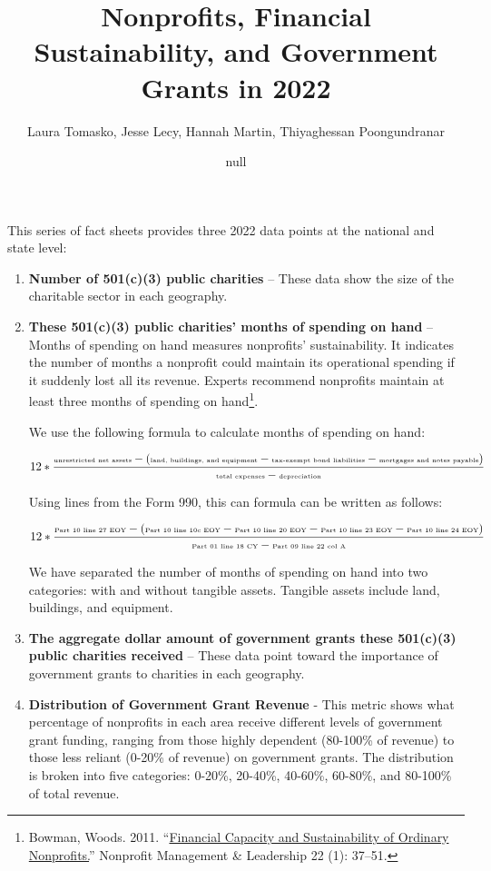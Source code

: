 \documentclass[
]{article}
\title{Nonprofits, Financial Sustainability, and Government Grants in
2022}
\subtitle{{Laura Tomasko, Jesse Lecy, Hannah Martin, Thiyaghessan
Poongundranar}}
\author{null}
\date{}
\begin{document}
\maketitle

This series of fact sheets provides three 2022 data points at the
national and state level:

\begin{enumerate}
\def\labelenumi{\arabic{enumi}.}
\item
  \textbf{Number of 501(c)(3) public charities} -- These data show the
  size of the charitable sector in each geography.
\item
  \textbf{These 501(c)(3) public charities' months of spending on hand}
  -- Months of spending on hand measures nonprofits' sustainability. It
  indicates the number of months a nonprofit could maintain its
  operational spending if it suddenly lost all its revenue. Experts
  recommend nonprofits maintain at least three months of spending on
  hand\footnote{Bowman, Woods. 2011.
    ``\href{https://doi.org/10.1002/nml.20039}{Financial Capacity and
    Sustainability of Ordinary Nonprofits.}'' Nonprofit Management \&
    Leadership 22 (1): 37--51.}.

  We use the following formula to calculate months of spending on hand:

  \[ \tiny 12 * \frac{\text{unrestricted net assets} - (\text{land, buildings, and equipment} - \text{tax-exempt bond liabilities} - \text{mortgages and notes payable})}{\text{total expenses} - \text{depreciation}} \]

  Using lines from the Form 990, this can formula can be written as
  follows:

  \[ \tiny 12 * \frac{\text{Part 10 line 27 EOY} - (\text{Part 10 line 10c EOY} - \text{Part 10 line 20 EOY} - \text{Part 10 line 23 EOY} - \text{Part 10 line 24 EOY})}{\text{Part 01 line 18 CY} - \text{Part 09 line 22 col A}} \]

  We have separated the number of months of spending on hand into two
  categories: with and without tangible assets. Tangible assets include
  land, buildings, and equipment.
\item
  \textbf{The aggregate dollar amount of government grants these
  501(c)(3) public charities received} -- These data point toward the
  importance of government grants to charities in each geography.
\item
  \textbf{Distribution of Government Grant Revenue} - This metric shows
  what percentage of nonprofits in each area receive different levels of
  government grant funding, ranging from those highly dependent
  (80-100\% of revenue) to those less reliant (0-20\% of revenue) on
  government grants. The distribution is broken into five categories:
  0-20\%, 20-40\%, 40-60\%, 60-80\%, and 80-100\% of total revenue.
\end{enumerate}
\end{document}
